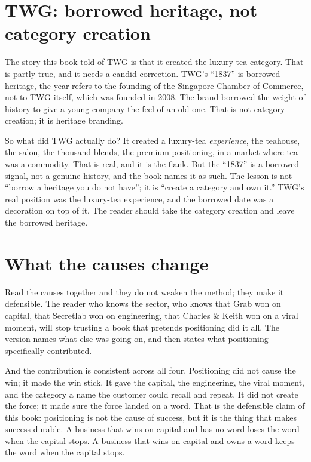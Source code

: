 \documentclass[10pt,twoside,openany]{memoir}
\newcommand{\needspacehead}{\needspace{4\baselineskip}}
\let\oldsection\section
\renewcommand{\section}{\needspacehead\oldsection}
\begin{document}
{\section{TWG: borrowed heritage, not category
creation}\label{twg-borrowed-heritage-not-category-creation}

The story this book told of TWG is that it created the luxury-tea
category. That is partly true, and it needs a candid correction. TWG's
``1837'' is borrowed heritage, the year refers to the founding of the
Singapore Chamber of Commerce, not to TWG itself, which was founded in
2008. The brand borrowed the weight of history to give a young company
the feel of an old one. That is not category creation; it is heritage
branding.

So what did TWG actually do? It created a luxury-tea \emph{experience},
the teahouse, the salon, the thousand blends, the premium positioning,
in a market where tea was a commodity. That is real, and it is the
flank. But the ``1837'' is a borrowed signal, not a genuine history, and
the book names it as such. The lesson is not ``borrow a heritage you do
not have''; it is ``create a category and own it.'' TWG's real position
was the luxury-tea experience, and the borrowed date was a decoration on
top of it. The reader should take the category creation and leave the
borrowed heritage.

\section{What the causes change}\label{what-the-causes-change}

Read the causes together and they do not weaken the method; they make it
defensible. The reader who knows the sector, who knows that Grab won on
capital, that Secretlab won on engineering, that Charles \& Keith won on
a viral moment, will stop trusting a book that pretends positioning did
it all. The version names what else was going on, and then states what
positioning specifically contributed.

And the contribution is consistent across all four. Positioning did not
cause the win; it made the win stick. It gave the capital, the
engineering, the viral moment, and the category a name the customer
could recall and repeat. It did not create the force; it made sure the
force landed on a word. That is the defensible claim of this book:
positioning is not the cause of success, but it is the thing that makes
success durable. A business that wins on capital and has no word loses
the word when the capital stops. A business that wins on capital and
owns a word keeps the word when the capital stops.

}
\end{document}
